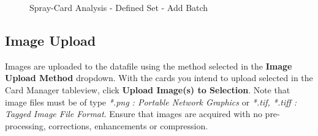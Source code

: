\documentclass[10pt,letterpaper,titlepage]{article}
\begin{document}
    \begin{figure}[hb]
        \centering
        \caption{Spray-Card Analysis - Defined Set - Add Batch}
        \label{fig:card_defined_set_batch}
    \end{figure}
    \FloatBarrier

    \subsection{Image Upload}
    \label{sec:image_upload}
    Images are uploaded to the datafile using the method selected in the \textbf{Image Upload Method} dropdown. With the cards you intend to upload selected in the Card Manager tableview, click \textbf{Upload Image(s) to Selection}. Note that image files must be of type \textit{*.png : Portable Network Graphics} or \textit{*.tif, *.tiff : Tagged Image File Format}. Ensure that images are acquired with no pre-processing, corrections, enhancements or compression.
\end{document}
